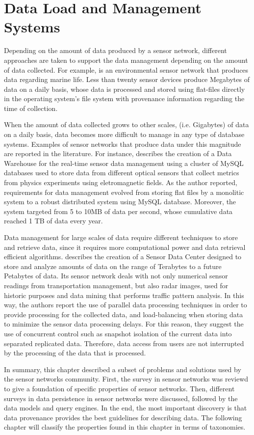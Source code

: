 \section{Data Load and Management Systems}
\label{sec:data-load}

Depending on the amount of data produced by a sensor network, different
approaches are taken to support the data management depending on
the amount of data collected. For example, \cite{sfbeams2006} is an
environmental sensor network that produces data regarding marine life.
Less than twenty sensor devices produce Megabytes of data on a daily basis,
whose data is processed and stored using flat-files directly in the
operating system's file system with provenance information regarding the time
of collection.

When the amount of data collected grows to other scales, (i.e. Gigabytes) of data
on a daily basis, data becomes more difficult to manage in any type of
database systems. Examples of sensor networks that produce data under this
magnitude are reported in the literature. For instance, 
\cite{sn-dataware-house} describes the creation of a Data Warehouse for the
real-time sensor data management using a cluster of MySQL databases used to
store data from different optical sensors that collect metrics
from physics experiments using eletromagnetic fields. As the author reported,
requirements for data management evolved from storing flat files by a
monolitic system to a robust distributed system using MySQL database.
Moreover, the system targeted from 5 to 10MB of data per second, whose
cumulative data reached 1 TB of data every year.

Data management for large scales of data require different techniques to store
and retrieve data, since it requires more computational power and data
retrieval efficient algorithms. \cite{sn-data-center} describes the creation of
a Sensor Data Center designed to store and analyze amounts of data on the range of
Terabytes to a future Petabytes of data. Its sensor network deals with not only
numerical sensor readings from transportation management, but also radar
images, used for historic purposes and data mining that performs traffic
pattern analysis. In this way, the authors report the use of parallel data
processing techniques in order to provide processing for the collected
data, and load-balancing when storing data to minimize the sensor data
processing delays. For this reason, they suggest the use of concurrent control
such as snapshot isolation of the current data into separated replicated data.
Therefore, data access from users are not interrupted by the processing of
the data that is processed.

In summary, this chapter described a subset of problems and solutions used by
the sensor networks community. First, the survey in sensor networks was
reviewd to give a foundation of specific properties of sensor networks. Then,
different surveys in data persistence in sensor networks were discussed,
followed by the data models and query engines. In the end, the most important 
discovery is that data provenance provides the best guidelines for describing 
data. The following chapter will classify the properties found in this chapter
in terms of taxonomies.